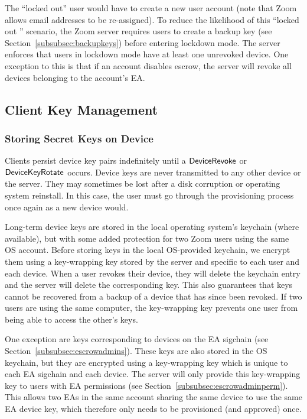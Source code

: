 The ``locked out'' user would have to create a new user account (note that Zoom allows email
addresses to be re-assigned). To reduce the likelihood of this ``locked out '' scenario, the Zoom
server requires users to create a backup key (see Section~\ref{subsubsec:backupkeys}) before
entering lockdown mode. The server enforces that users in lockdown mode have at least one unrevoked
device. One exception to this is that if an account disables escrow, the server will revoke all
devices belonging to the account's EA.



\subsection{Client Key Management}
\label{subsec:clientkeys}

\subsubsection{Storing Secret Keys on Device}
\label{subsec:lks}

Clients persist device key pairs indefinitely until a $\mathsf{DeviceRevoke}{}$ or $\mathsf{DeviceKeyRotate}{}$
occurs. Device keys are never transmitted to any other device or the server. They may sometimes be
lost after a disk corruption or operating system reinstall. In this case, the user must go through
the provisioning process once again as a new device would.

Long-term device keys are stored in the local operating system's keychain (where available), but
with some added protection for two Zoom users using the same OS account.
%
Before storing keys in the local OS-provided keychain, we encrypt them using a key-wrapping key
stored by the server and specific to each user and each device. 
%
When a user revokes their device, they will delete the keychain entry and the server will delete the
corresponding key. This also guarantees that keys cannot be recovered from a backup of a device that
has since been revoked.
%
If two users are using the same computer, the key-wrapping key prevents one user from being able to
access the other's keys. 

One exception are keys corresponding to devices on the EA sigchain (see
Section~\ref{subsubsec:escrowadmins}). These keys are also stored in the OS keychain, but they are
encrypted using a key-wrapping key which is unique to each EA sigchain and each device. The server
will only provide this key-wrapping key to users with EA permissions (see
Section~\ref{subsubsec:escrowadminperm}). This allows two EAs in the same account sharing the same
device to use the same EA device key, which therefore only needs to be provisioned (and approved)
once.

